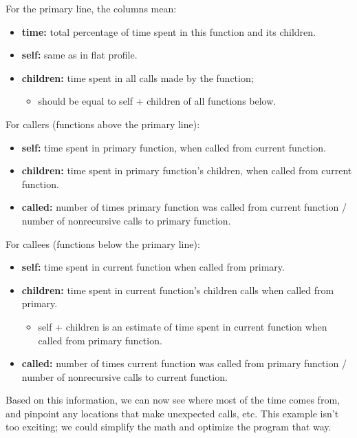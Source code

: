 \documentclass[a4paper]{report}
\begin{document}
For the primary line, the columns mean:
  \begin{itemize}  
    \item {\bf time:} total percentage of time spent in this function and its
      children.
    \item {\bf self:} same as in flat profile.
    \item {\bf children:} time spent in all calls made by the function;
      \begin{itemize}
        \item should be equal to self + children of all functions below.
      \end{itemize}
  \end{itemize}

For callers (functions above the primary line):
  \begin{itemize}
    \item {\bf self:} time spent in primary function, when called from current
      function.
    \item {\bf children:} time spent in primary function's children, when
      called from current function.
    \item {\bf called:} number of times primary function was called from current
      function / number of nonrecursive calls to primary function.
  \end{itemize}

For callees (functions below the primary line):
  \begin{itemize}  
    \item {\bf self:} time spent in current function when called from primary.
    \item {\bf children:} time spent in current function's children calls when
      called from primary.
      \begin{itemize}
        \item self + children is an estimate of time spent in current function
          when called from primary function.
      \end{itemize}
    \item {\bf called:} number of times current function was called from primary
      function / number of nonrecursive calls to current function.
  \end{itemize}

Based on this information, we can now see where most of the time comes
from, and pinpoint any locations that make unexpected calls, etc.
This example isn't too exciting; we could simplify the math and optimize the
program that way.
\end{document}
